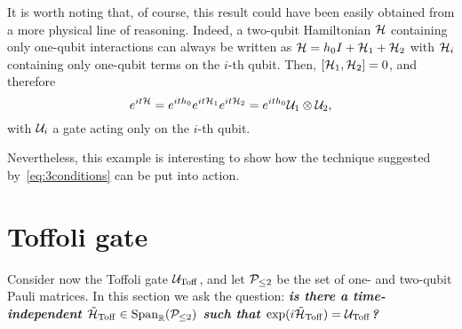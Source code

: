 \begin{example}[label={ex:cnot_with_conditions}]
It is worth noting that, of course, this result could have been easily obtained from a more physical line of reasoning. Indeed, a two-qubit Hamiltonian ${\mathcal{H}}$ containing only one-qubit interactions can always be written as ${\mathcal{H}}=h_0 I+{\mathcal{H}}_1+{\mathcal{H}}_2$ with ${\mathcal{H}}_i$ containing only one-qubit terms on the $i$-th qubit. Then, $[{\mathcal{H}}_1,{\mathcal{H}}_2]=0$, and therefore
\begin{equation}
    e^{it{\mathcal{H}}}=e^{it h_0}e^{it{\mathcal{H}}_1}e^{it{\mathcal{H}}_2}=e^{it h_0} {\mathcal{U}}_1\otimes{\mathcal{U}}_2,
\end{equation}
with ${\mathcal{U}}_i$ a gate acting only on the $i$-th qubit.

Nevertheless, this example is interesting to show how the technique suggested by~\cref{eq:3conditions} can be put into action.
\end{example}

\section{Toffoli gate}
\label{sec:gatelearning_toffoli}
Consider now the Toffoli gate ${\mathcal{U}}_{\operatorname{Toff}}$, and let ${\mathcal{P}}_{\le2}$ be the set of one- and two-qubit Pauli matrices. In this section we ask the question: \textit{\textbf{is there a time-independent $\tilde{{\mathcal{H}}}_{\operatorname{Toff}}\in\operatorname{Span}_{\mathbb{R}}({\mathcal{P}}_{\le2})$ such that $\exponential(i\HTildeToff)=\UToff$?}}

